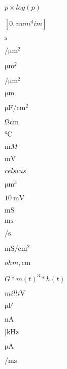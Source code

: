 \documentclass{article}
\begin{document}
$p\times log(p)$
\pagebreak

$[0,num^dim]$
\pagebreak

$\si{\second}$
\pagebreak

$\si{\per\micro\meter\squared}$
\pagebreak

$\si{\micro\meter\squared}$
\pagebreak

$\si{\per\micro\meter\squared} $
\pagebreak

$\si{\micro\meter}$
\pagebreak

$\si{\micro\farad\per\centi\meter\squared}$
\pagebreak

$\si{\ohm\centi\meter}$
\pagebreak

$\si{\celsius}$
\pagebreak

$\si{\milli M}$
\pagebreak

$\si{\milli\volt}$
\pagebreak

$\si{celsius}$
\pagebreak

$\si{\micro\meter\cubed}$
\pagebreak

$\SI{10}{\milli\volt}$
\pagebreak

$\si{\milli\siemens}$
\pagebreak

$\si{\milli\second}$
\pagebreak

$\si{\per\second}$
\pagebreak

$\si{\milli\siemens\per\centi\meter\squared}$
\pagebreak

$\si{ohm,\centi\meter}$
\pagebreak

$G*m(t)^3*h(t)$
\pagebreak

$\si{milli\volt}$
\pagebreak

$\si{\micro\farad}$
\pagebreak

$\si{\nano\ampere}$
\pagebreak

$[\si{\kilo\hertz}$
\pagebreak

$\si{\micro\ampere}$
\pagebreak

$\si{\per\milli\second}$
\pagebreak
\end{document}
